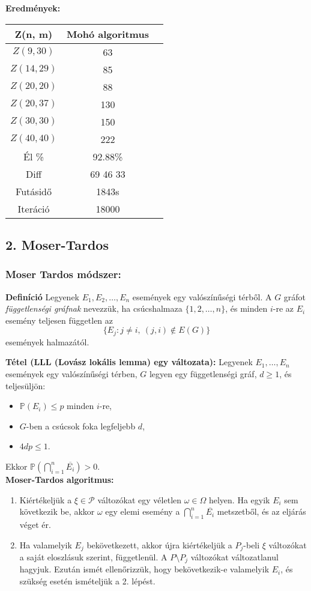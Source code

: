 \documentclass[12pt,a4paper]{article}
\begin{document}
\textbf{Eredmények:}
\begin{table}[H]
\centering
\begin{tabular}{|c|c|c|}
\hline
\textbf{Z(n, m)} & \textbf{Mohó algoritmus} \\
\hline
$Z(9,30)$  & 63 \\
$Z(14, 29)$ & 85 \\
$Z(20, 20)$ & 88 \\
$Z(20, 37)$ & 130 \\
$Z(30, 30)$ & 150 \\
$Z(40, 40)$ & 222 \\
\hline
Él \% & 92.88\% \\
\hline
Diff & 69 46 33 \\
\hline
Futásidő & 1843s \\
Iteráció & 18000 \\
\hline
\end{tabular}
\end{table}

\subsection*{2. Moser-Tardos}

\subsubsection*{Moser Tardos módszer:}
\textbf{Definíció} Legyenek $E_1, E_2, \ldots, E_n$ események egy valószínűségi térből.  
    A $G$ gráfot \emph{függetlenségi gráfnak} nevezzük, ha csúcshalmaza $\{1, 2, \ldots, n\}$, és minden $i$-re az $E_i$ esemény teljesen független az 
    \[
    \{ E_j : j \ne i,\ (j, i) \notin E(G) \}
    \]
    események halmazától.
    
    
    \noindent \textbf{Tétel (LLL (Lovász lokális lemma) egy változata):} Legyenek $E_1, \dots, E_n$ események egy valószínűségi térben, $G$ legyen egy függetlenségi gráf, $d \geq 1$, és teljesüljön:
    \begin{itemize}
        \item $\mathbb{P}(E_i) \leq p$ minden $i$-re,
        \item $G$-ben a csúcsok foka legfeljebb $d$,
        \item $4dp \leq 1$.
    \end{itemize}
    Ekkor $\mathbb{P}\left( \bigcap_{i=1}^n \overline{E_i} \right) > 0$.
    \\[2mm]
    \textbf{Moser-Tardos algoritmus:}
    \begin{enumerate}
        \item Kiértékeljük a $\xi \in \mathcal{P}$ változókat egy véletlen $\omega \in \Omega$ helyen. Ha egyik $E_i$ sem következik be, akkor $\omega$ egy elemi esemény a $\bigcap_{i=1}^n \overline{E_i}$ metszetből, és az eljárás véget ér.
        \item Ha valamelyik $E_j$ bekövetkezett, akkor újra kiértékeljük a $P_j$-beli $\xi$ változókat a saját eloszlásuk szerint, függetlenül. A $P \setminus P_j$ változókat változatlanul hagyjuk. Ezután ismét ellenőrizzük, hogy bekövetkezik-e valamelyik $E_i$, és szükség esetén ismételjük a 2. lépést.
    \end{enumerate}
\end{document}
